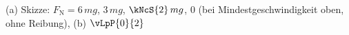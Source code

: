(a) Skizze: $F_\mathrm{N} = 6\,mg$, $3\,mg$, $\kNcS{2}\,mg$, $0$ (bei Mindestgeschwindigkeit oben, ohne Reibung), (b) $\vLpP{0}{2}$
